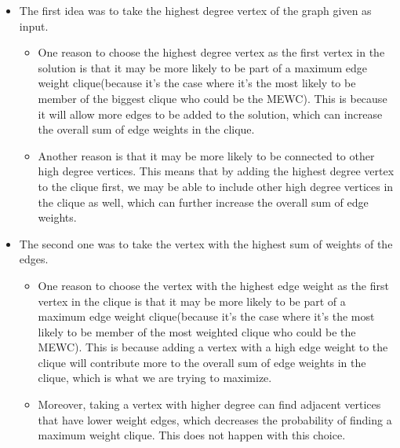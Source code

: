 \begin{itemize}
    \item The first idea was to take the highest degree vertex of the graph given as input.
          \begin{itemize}
              \item One reason to choose the highest degree vertex as the first vertex in the solution is that it may be more likely to be part of a maximum edge weight clique(because it's the case where it's the most likely to be member of the biggest clique who could be the MEWC). This is because it will allow more edges to be added to the solution, which can increase the overall sum of edge weights in the clique.
              \item Another reason is that it may be more likely to be connected to other high degree vertices. This means that by adding the highest degree vertex to the clique first, we may be able to include other high degree vertices in the clique as well, which can further increase the overall sum of edge weights.
          \end{itemize}
    \item The second one was to take the vertex with the highest sum of weights of the edges.
          \begin{itemize}
              \item One reason to choose the vertex with the highest edge weight as the first vertex in the clique is that it may be more likely to be part of a maximum edge weight clique(because it's the case where it's the most likely to be member of the most weighted clique who could be the MEWC). This is because adding a vertex with a high edge weight to the clique will contribute more to the overall sum of edge weights in the clique, which is what we are trying to maximize.
              \item Moreover, taking a vertex with higher degree can find adjacent vertices that have lower weight edges, which decreases the probability of finding a maximum weight clique. This does not happen with this choice.
          \end{itemize}
\end{itemize}

\vspace{1\baselineskip}

